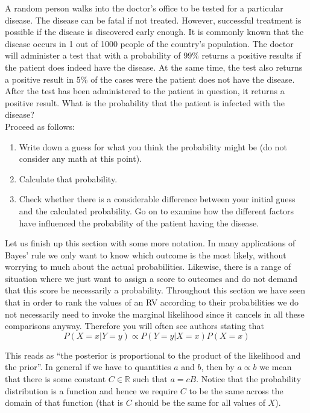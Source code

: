 \begin{Exercise}
A random person walks into the doctor's office to be tested for a particular disease. The disease can be fatal if not treated. However,
successful treatment is possible if the disease is discovered early enough. It is commonly known that the disease occurs in 1 out
of 1000 people of the country's population. The doctor will administer a test that with a probability of 99\% returns a positive results
if the patient does indeed have the disease. At the same time, the test also returns a positive result in 5\% of the cases were the
patient does not have the disease. After the test has been administered to the patient in question, it returns a positive result.
What is the probability that the patient is infected with the disease? 
\\
Proceed as follows:
\begin{enumerate}
\item Write down a guess for what you think the probability might be (do not consider any math at this point).
\item Calculate that probability.
\item Check whether there is a considerable difference between your initial guess and the calculated probability. Go on to examine
how the different factors have influenced the probability of the patient having the disease.
\end{enumerate}
\end{Exercise}

Let us finish up this section with some more notation. In many applications of Bayes' rule we only want to know which outcome is
the most likely, without worrying to much about the actual probabilities. Likewise, there is a range of situation where we
just want to assign a score to outcomes and do not demand that this score be necessarily a probability. Throughout this section
we have seen that in order to rank the values of an RV according to their probabilities we do not necessarily need to invoke
the marginal likelihood since it cancels in all these comparisons anyway. Therefore you will often see authors stating that
\begin{equation} \label{proportionality}
P(X=x|Y=y) \propto P(Y=y|X=x)P(X=x)
\end{equation}

This reads as ``the posterior is proportional to the product of the likelihood and the prior''. In general if we have to quantities
$ a $ and $ b $, then by $ a \propto b $ we mean that there is some constant $ C \in \mathbb{R} $ such that $ a = cB $. Notice
that the probability distribution is a function and hence we require $ C $ to be the same across the domain of that function (that
is $ C $ should be the same for all values of $ X $).

